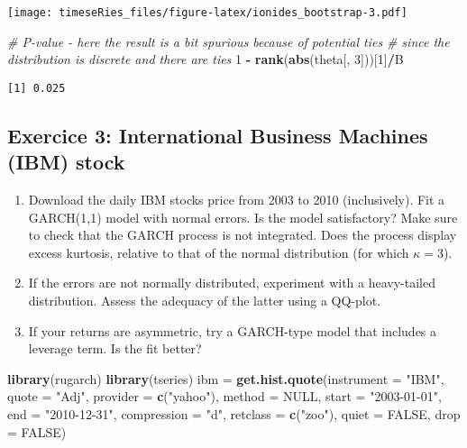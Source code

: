 \documentclass[]{book}
\newenvironment{Shaded}{\begin{snugshade}}{\end{snugshade}}
\newcommand{\CommentTok}[1]{\textcolor[rgb]{0.56,0.35,0.01}{\textit{#1}}}
\newcommand{\DataTypeTok}[1]{\textcolor[rgb]{0.13,0.29,0.53}{#1}}
\newcommand{\DecValTok}[1]{\textcolor[rgb]{0.00,0.00,0.81}{#1}}
\newcommand{\KeywordTok}[1]{\textcolor[rgb]{0.13,0.29,0.53}{\textbf{#1}}}
\newcommand{\NormalTok}[1]{#1}
\newcommand{\OperatorTok}[1]{\textcolor[rgb]{0.81,0.36,0.00}{\textbf{#1}}}
\newcommand{\OtherTok}[1]{\textcolor[rgb]{0.56,0.35,0.01}{#1}}
\newcommand{\StringTok}[1]{\textcolor[rgb]{0.31,0.60,0.02}{#1}}
\providecommand{\tightlist}{%
  \setlength{\itemsep}{0pt}\setlength{\parskip}{0pt}}
\begin{document}
\texttt{[image: timeseRies\_files/figure-latex/ionides\_bootstrap-3.pdf]}

\begin{Shaded}
\begin{Highlighting}[]
\CommentTok{# P-value - here the result is a bit spurious because of potential ties}
\CommentTok{# since the distribution is discrete and there are ties}
\DecValTok{1} \OperatorTok{-}\StringTok{ }\KeywordTok{rank}\NormalTok{(}\KeywordTok{abs}\NormalTok{(theta[, }\DecValTok{3}\NormalTok{]))[}\DecValTok{1}\NormalTok{]}\OperatorTok{/}\NormalTok{B}
\end{Highlighting}
\end{Shaded}

\begin{verbatim}
[1] 0.025
\end{verbatim}

\hypertarget{exercice-3-international-business-machines-ibm-stock-1}{%
\subsection{Exercice 3: International Business Machines (IBM)
stock}\label{exercice-3-international-business-machines-ibm-stock-1}}

\begin{enumerate}
\def\labelenumi{\arabic{enumi}.}
\tightlist
\item
  Download the daily IBM stocks price from 2003 to 2010 (inclusively).
  Fit a GARCH(1,1) model with normal errors. Is the model satisfactory?
  Make sure to check that the GARCH process is not integrated. Does the
  process display excess kurtosis, relative to that of the normal
  distribution (for which \(\kappa=3\)).
\item
  If the errors are not normally distributed, experiment with a
  heavy-tailed distribution. Assess the adequacy of the latter using a
  QQ-plot.
\item
  If your returns are asymmetric, try a GARCH-type model that includes a
  leverage term. Is the fit better?
\end{enumerate}

\begin{Shaded}
\begin{Highlighting}[]
\KeywordTok{library}\NormalTok{(rugarch)}
\KeywordTok{library}\NormalTok{(tseries)}
\NormalTok{ibm =}\StringTok{ }\KeywordTok{get.hist.quote}\NormalTok{(}\DataTypeTok{instrument =} \StringTok{"IBM"}\NormalTok{, }\DataTypeTok{quote =} \StringTok{"Adj"}\NormalTok{, }\DataTypeTok{provider =} \KeywordTok{c}\NormalTok{(}\StringTok{"yahoo"}\NormalTok{), }
    \DataTypeTok{method =} \OtherTok{NULL}\NormalTok{, }\DataTypeTok{start =} \StringTok{"2003-01-01"}\NormalTok{, }\DataTypeTok{end =} \StringTok{"2010-12-31"}\NormalTok{, }\DataTypeTok{compression =} \StringTok{"d"}\NormalTok{, }
    \DataTypeTok{retclass =} \KeywordTok{c}\NormalTok{(}\StringTok{"zoo"}\NormalTok{), }\DataTypeTok{quiet =} \OtherTok{FALSE}\NormalTok{, }\DataTypeTok{drop =} \OtherTok{FALSE}\NormalTok{)}
\end{Highlighting}
\end{Shaded}
\end{document}
